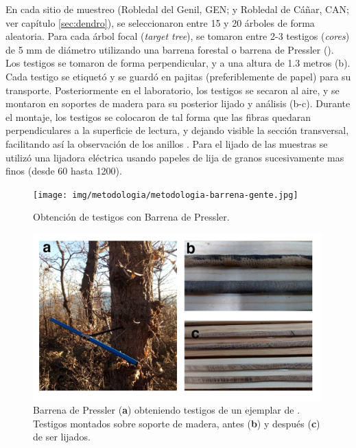 En cada sitio de muestreo (Robledal del Genil, GEN; y Robledal de Cáñar, CAN; ver capítulo \ref{sec:dendro}), se seleccionaron entre 15 y 20 árboles de forma aleatoria. Para cada árbol focal (\emph{target tree}), se tomaron entre 2-3 testigos (\emph{cores}) de 5 mm de diámetro utilizando una barrena forestal o barrena de Pressler \autocite{GrissinoMayer2003ManualTutorial} (). Los testigos se tomaron de forma perpendicular, y a una altura de 1.3 metros (b). Cada testigo se etiquetó y se guardó en pajitas (preferiblemente de papel) para su transporte. Posteriormente en el laboratorio, los testigos se secaron al aire, y se montaron en soportes de madera para su posterior lijado y análisis (b-c). Durante el montaje, los testigos se colocaron de tal forma que las fibras quedaran perpendiculares a la superficie de lectura, y dejando visible la sección transversal, facilitando así la observación de los anillos \autocite{Fritts1976TreeRings,Natalinietal2017TecnicasHerramientas}. Para el lijado de las muestras se utilizó una lijadora eléctrica usando papeles de lija de granos sucesivamente mas finos (desde 60 hasta 1200).

\begin{figure}
    \centering
    \texttt{[image: img/metodologia/metodologia-barrena-gente.jpg]}
    \caption{Obtención de testigos con Barrena de Pressler.}
    \label{fig:metodologia:barrena-gente}
\end{figure}

\begin{figure}
    \centering
    \includegraphics[width=0.99\textwidth]{img/metodologia/metodologia-cores-combina.jpg}
    \caption{Barrena de Pressler (\textbf{a}) obteniendo testigos de un ejemplar de \Qpy. Testigos montados sobre soporte de madera, antes (\textbf{b}) y después (\textbf{c}) de ser lijados.}
    \label{fig:metodologia:cores-combina}
\end{figure}

